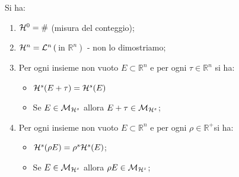 \begin{shadedTheorem}\label{thm: hausdorff piccolo}
  Si ha:
  \begin{enumerate}
    \item $\mathcal{H}^{0}=\#$ (misura del conteggio);
    \item $\mathcal{H}^{n}=\mathcal{L}^{n}\left(\right.$in $\left.\mathbb{R}^{n}\right)$ - non lo dimostriamo;
    \item Per ogni insieme non vuoto $E \subset \mathbb{R}^{n}$ e per ogni $\tau \in \mathbb{R}^{n}$ si ha:
    \begin{itemize}
      \item $\mathcal{H}^{s}(E+\tau)=\mathcal{H}^{s}(E)$
      \item Se $E \in \mathcal{M}_{\mathcal{H}^{s}}$ allora $E+\tau \in \mathcal{M}_{\mathcal{H}^{s}}$;
    \end{itemize}
    \item Per ogni insieme non vuoto $E \subset \mathbb{R}^{n}$ e per ogni $\rho \in \mathbb{R}^{+}$si ha:
    \begin{itemize}
      \item $\mathcal{H}^{s}(\rho E)=\rho^{s} \mathcal{H}^{s}(E)$;
      \item Se $E \in \mathcal{M}_{\mathcal{H}^{s}}$ allora $\rho E \in \mathcal{M}_{\mathcal{H}^{s}}$;
    \end{itemize}
  \end{enumerate}
\end{shadedTheorem}
